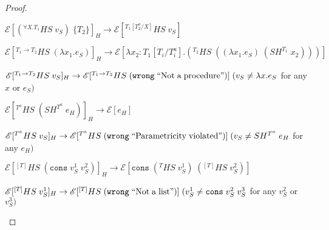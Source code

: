 \begin{theorem}
\begin{proof}
\begin{case}
\end{case}
\begin{case}
$\mathscr{E}[(^{\forall X.T_{1}}HS\;v_{S})\;\lbrace T_{2}\rbrace]_{H}\rightarrow\mathscr{E}[^{T_{1}[T^{a}_{2}/X]}HS\;v_{S}]$

\end{case}
\begin{case}
$\mathscr{E}[^{T_{1}\rightarrow T_{2}}HS\;(\lambda x_{1}.e_{S})]_{H}\rightarrow\mathscr{E}[\lambda x_{2}:T_{1}[T_{i}/T^{a}_{i}].(^{T_{2}}HS\;((\lambda x_{1}.e_{S})\;(SH^{T_{1}}\;x_{2})))]$

\end{case}
\begin{case}
$\mathscr{E}[^{T_{1}\rightarrow T_{2}}HS\;v_{S}]_{H}\rightarrow\mathscr{E}[^{T_{1}\rightarrow T_{2}}HS\;(\mathtt{wrong}\;\mathrm{``Not\;a\;procedure"})]\;(v_{S}\neq\lambda x.e_{S}$ for any $x$ or $e_{S})$

\end{case}
\begin{case}
$\mathscr{E}[^{T^{a}}HS\;(SH^{T^{a}}\;e_{H})]_{H}\rightarrow\mathscr{E}[e_{H}]$

\end{case}
\begin{case}
$\mathscr{E}[^{T^{a}}HS\;v_{S}]_{H}\rightarrow\mathscr{E}[^{T^{a}}HS\;(\mathtt{wrong}\;\mathrm{``Parametricity\;violated"})]\;(v_{S}\neq SH^{T^{a}}\;e_{H}$ for any $e_{H})$

\end{case}
\begin{case}
$\mathscr{E}[^{[T]}HS\;(\mathtt{cons}\;v_{S}^{1}\;v_{S}^{2})]_{H}\rightarrow\mathscr{E}[\mathtt{cons}\;(^{T}HS\;v_{S}^{1})\;(^{[T]}HS\;v_{S}^{2})]$

\end{case}
\begin{case}
$\mathscr{E}[^{[T]}HS\;v_{S}^{1}]_{H}\rightarrow\mathscr{E}[^{[T]}HS\;(\mathtt{wrong}\;\mathrm{``Not\;a\;list"})]\;(v_{S}^{1}\neq\mathtt{cons}\;v_{S}^{2}\;v_{S}^{3}$ for any $v_{S}^{2}$ or $v_{S}^{3})$

\end{case}
\end{proof}
\end{theorem}